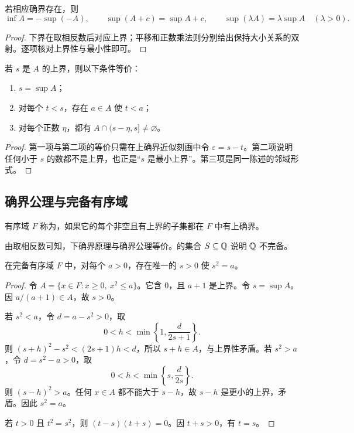 \begin{proposition}
若相应确界存在，则
\[
 \inf A=-\sup(-A),\qquad
 \sup(A+c)=\sup A+c,\qquad
 \sup(\lambda A)=\lambda\sup A\quad(\lambda>0).
\]
\end{proposition}

\begin{proof}
下界在取相反数后对应上界；平移和正数乘法则分别给出保持大小关系的双射。逐项核对上界性与最小性即可。
\end{proof}

\begin{proposition}[误差刻画的变体]
若 \(s\) 是 \(A\) 的上界，则以下条件等价：
\begin{enumerate}
 \item \(s=\sup A\)；
 \item 对每个 \(t<s\)，存在 \(a\in A\) 使 \(t<a\)；
 \item 对每个正数 \(\eta\)，都有 \(A\cap(s-\eta,s]\ne\varnothing\)。
\end{enumerate}
\end{proposition}

\begin{proof}
第一项与第二项的等价只需在上确界近似刻画中令 \(\varepsilon=s-t\)。第二项说明任何小于 \(s\) 的数都不是上界，也正是“\(s\) 是最小上界”。第三项是同一陈述的邻域形式。
\end{proof}

\subsection{确界公理与完备有序域}


\begin{definition}
有序域 \(F\) 称为，如果它的每个非空且有上界的子集都在 \(F\) 中有上确界。
\end{definition}

由取相反数可知，下确界原理与确界公理等价。的集合 \(S\subseteq\mathbb{Q}\) 说明 \(\mathbb{Q}\) 不完备。

\begin{theorem}[正数平方根]
在完备有序域 \(F\) 中，对每个 \(a>0\)，存在唯一的 \(s>0\) 使 \(s^2=a\)。
\end{theorem}

\begin{proof}
令 \(A=\{x\in F:x\ge0,\ x^2\le a\}\)。它含 \(0\)，且 \(a+1\) 是上界。令 \(s=\sup A\)。因 \(a/(a+1)\in A\)，故 \(s>0\)。

若 \(s^2<a\)，令 \(d=a-s^2>0\)，取
\[
 0<h<\min\left\{1,\frac d{2s+1}\right\}.
\]
则 \((s+h)^2-s^2<(2s+1)h<d\)，所以 \(s+h\in A\)，与上界性矛盾。若 \(s^2>a\)，令 \(d=s^2-a>0\)，取
\[
 0<h<\min\left\{s,\frac d{2s}\right\}.
\]
则 \((s-h)^2>a\)。任何 \(x\in A\) 都不能大于 \(s-h\)，故 \(s-h\) 是更小的上界，矛盾。因此 \(s^2=a\)。

若 \(t>0\) 且 \(t^2=s^2\)，则 \((t-s)(t+s)=0\)。因 \(t+s>0\)，有 \(t=s\)。
\end{proof}

